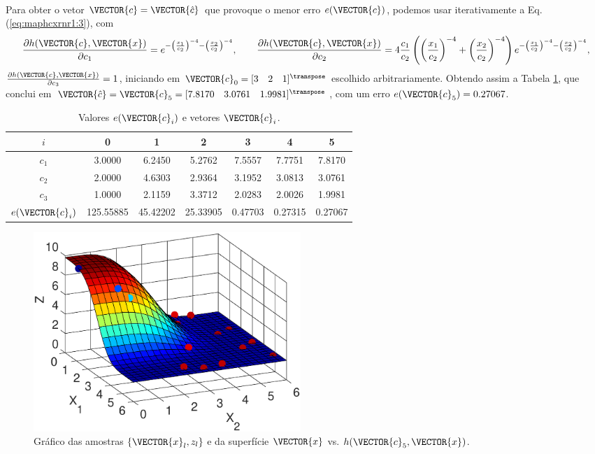 ~

\begin{SolutionT}\label{sol:theo:maphcxrnr1}
Para obter  o vetor $\VECTOR{c}=\VECTOR{\hat{c}}$
que provoque o menor erro $e(\VECTOR{c})$,
podemos usar iterativamente a Eq. (\ref{eq:maphcxrnr1:3}), com 
\begin{equation}
\frac{\partial h(\VECTOR{c},\VECTOR{x})}{\partial c_1} 
= e^{-\left(\frac{x_1}{c_2}\right)^{-4}-\left(\frac{x_2}{c_2}\right)^{-4}},\qquad 
\frac{\partial h(\VECTOR{c},\VECTOR{x})}{\partial c_2} 
= 4\frac{c_1}{c_2}\left(\left(\frac{x_1}{c_2}\right)^{-4}+\left(\frac{x_2}{c_2}\right)^{-4}\right)e^{-\left(\frac{x_1}{c_2}\right)^{-4}-\left(\frac{x_2}{c_2}\right)^{-4}}, 
\end{equation} 
$\frac{\partial h(\VECTOR{c},\VECTOR{x})}{\partial c_3} =1$,
iniciando em $\VECTOR{c}_{0}=[3\quad 2\quad 1]^{\transpose}$ escolhido arbitrariamente.
Obtendo assim a Tabela \ref{table:theo:maphcxrnr1:ei}, que conclui em
$\VECTOR{\hat{c}}=\VECTOR{c}_{5}=[7.8170\quad 3.0761\quad 1.9981]^{\transpose}$,
com  um erro $e(\VECTOR{c}_{5})=0.27067$.


\begin{table}[h!]
\centering
\begin{tabular}{|c|c|c|c|c|c|c|} 
 \hline
$i$   & 0 & 1 & 2 & 3 & 4 & 5 \\ \hline
\hline
$c_1$ & 3.0000 & 6.2450 & 5.2762 & 7.5557 & 7.7751 & 7.8170 \\ \hline
$c_2$ & 2.0000 & 4.6303 & 2.9364 & 3.1952 & 3.0813 & 3.0761 \\ \hline
$c_3$ & 1.0000 & 2.1159 & 3.3712 & 2.0283 & 2.0026 & 1.9981 \\ \hline
\hline
$e(\VECTOR{c}_{i})$ & 125.55885 & 45.42202 & 25.33905 & 0.47703 & 0.27315 & 0.27067  \\ \hline
\end{tabular}
\caption{Valores $e(\VECTOR{c}_{i})$ e vetores $\VECTOR{c}_{i}$.}
\label{table:theo:maphcxrnr1:ei}
\end{table}

    \begin{figure}[!h]
        \centering
        \includegraphics[width=0.49\textwidth]{chapters/mapeamento/mfiles/mapeamentornr1-nonlinear/minimizando_hx.eps}
        \caption{Gráfico das amostras $\{\VECTOR{x}_l,z_l\}$ e da superfície $\VECTOR{x}$ vs. $h(\VECTOR{c}_5,\VECTOR{x})$.}
        \label{fig:theo:maphcxrnr1:xnyn}
    \end{figure}

\end{SolutionT}


